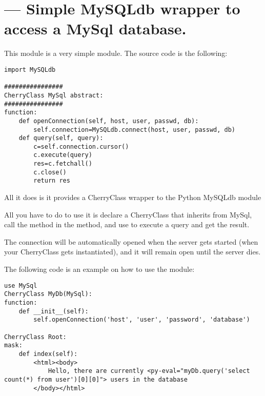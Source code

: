\section{ --- Simple MySQLdb wrapper to access a MySql database.}

This module is a very simple module. The source code is the following:

\begin{verbatim}
import MySQLdb

################
CherryClass MySql abstract:
################
function:
    def openConnection(self, host, user, passwd, db):
        self.connection=MySQLdb.connect(host, user, passwd, db)
    def query(self, query):
        c=self.connection.cursor()
        c.execute(query)
        res=c.fetchall()
        c.close()
        return res
\end{verbatim}

All it does is it provides a CherryClass wrapper to the Python MySQLdb module

All you have to do to use it is declare a CherryClass that inherits from MySql, call the 
method in the  method, and use  to execute a query and get the result.

The connection will be automatically opened when the server gets started (when your CherryClass gets instantiated), and
it will remain open until the server dies.

The following code is an example on how to use the module:

\begin{verbatim}
use MySql
CherryClass MyDb(MySql):
function:
    def __init__(self):
        self.openConnection('host', 'user', 'password', 'database')

CherryClass Root:
mask:
    def index(self):
        <html><body>
            Hello, there are currently <py-eval="myDb.query('select count(*) from user')[0][0]"> users in the database
        </body></html>
\end{verbatim}
